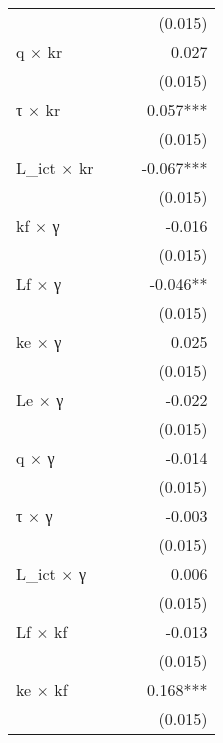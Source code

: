 \begin{tabular}{lrrr}
                       &            &            &    (0.015) \\ 
q $\times$ kr          &            &            &      0.027 \\ 
                       &            &            &    (0.015) \\ 
τ $\times$ kr          &            &            &   0.057*** \\ 
                       &            &            &    (0.015) \\ 
L\_ict $\times$ kr     &            &            &  -0.067*** \\ 
                       &            &            &    (0.015) \\ 
kf $\times$ γ          &            &            &     -0.016 \\ 
                       &            &            &    (0.015) \\ 
Lf $\times$ γ          &            &            &   -0.046** \\ 
                       &            &            &    (0.015) \\ 
ke $\times$ γ          &            &            &      0.025 \\ 
                       &            &            &    (0.015) \\ 
Le $\times$ γ          &            &            &     -0.022 \\ 
                       &            &            &    (0.015) \\ 
q $\times$ γ           &            &            &     -0.014 \\ 
                       &            &            &    (0.015) \\ 
τ $\times$ γ           &            &            &     -0.003 \\ 
                       &            &            &    (0.015) \\ 
L\_ict $\times$ γ      &            &            &      0.006 \\ 
                       &            &            &    (0.015) \\ 
Lf $\times$ kf         &            &            &     -0.013 \\ 
                       &            &            &    (0.015) \\ 
ke $\times$ kf         &            &            &   0.168*** \\ 
                       &            &            &    (0.015) \\ 

\end{tabular}
